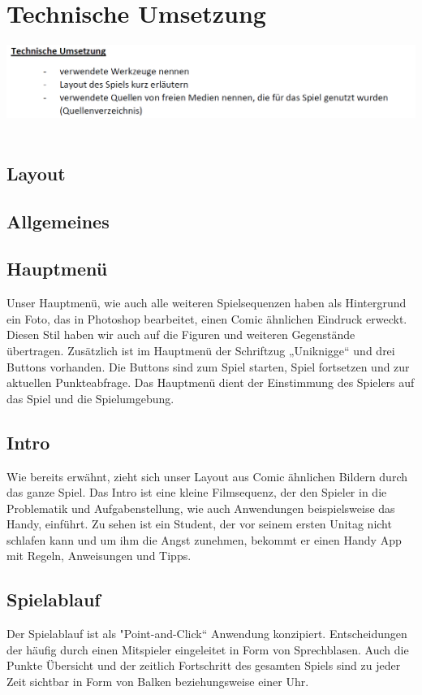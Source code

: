 \documentclass[a4paper, 11pt]{article} %
\begin{document}
\section{Technische Umsetzung}
\includegraphics[scale=0.5]{images/umsetzung.png}\\\\
\subsection{Layout}
\subsection{Allgemeines}
\subsection{Hauptmenü}
Unser Hauptmenü, wie auch alle weiteren Spielsequenzen haben als Hintergrund ein Foto, das in Photoshop bearbeitet, einen Comic ähnlichen Eindruck erweckt. Diesen Stil haben wir auch auf die Figuren und weiteren Gegenstände übertragen.
Zusätzlich ist im Hauptmenü der Schriftzug „Uniknigge“ und drei Buttons vorhanden. Die Buttons sind zum Spiel starten, Spiel fortsetzen und zur aktuellen Punkteabfrage. Das Hauptmenü dient der Einstimmung des Spielers auf das Spiel und die Spielumgebung.

\subsection{Intro}
Wie bereits erwähnt, zieht sich unser Layout aus Comic ähnlichen Bildern durch das ganze Spiel. Das Intro ist eine kleine Filmsequenz, der den Spieler in die Problematik und Aufgabenstellung, wie auch Anwendungen beispielsweise das Handy, einführt. Zu sehen ist ein Student, der vor seinem ersten Unitag nicht schlafen kann und um ihm die Angst zunehmen, bekommt er einen Handy App mit Regeln, Anweisungen und Tipps.

\subsection{Spielablauf}
Der Spielablauf ist als "Point-and-Click“ Anwendung konzipiert. Entscheidungen der häufig durch einen Mitspieler eingeleitet in Form von Sprechblasen.
Auch die Punkte Übersicht und der zeitlich Fortschritt des gesamten Spiels sind zu jeder Zeit sichtbar in Form von Balken beziehungsweise einer Uhr.
\end{document}
